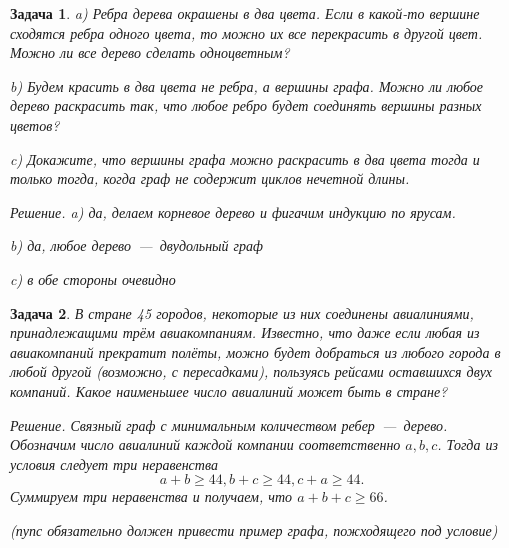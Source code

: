\documentclass[12pt,a4paper,fleqn]{article}
\newtheorem{exersize}{Задача}
\begin{document}
\begin{exersize}
	a) Ребра дерева окрашены в два цвета. Если в какой-то вершине сходятся ребра одного цвета, то можно их все перекрасить в другой цвет. Можно ли все дерево сделать одноцветным?
	
	b) Будем красить в два цвета не ребра, а вершины графа. Можно ли любое дерево раскрасить так, что любое ребро будет соединять вершины разных цветов?
	
	c) Докажите, что вершины графа можно раскрасить в два цвета тогда и только тогда, когда граф не содержит циклов нечетной длины.
	
	\emph{Решение.} a) да, делаем корневое дерево и фигачим индукцию по ярусам.
	
	b) да, любое дерево~---~двудольный граф
	
	c) в обе стороны очевидно
\end{exersize}	

\begin{exersize}
	В стране 45 городов, некоторые из них соединены авиалиниями, принадлежащими трём авиакомпаниям. Известно, что даже если любая из авиакомпаний прекратит полёты, можно будет добраться из любого города в любой другой (возможно, с пересадками), пользуясь рейсами оставшихся двух компаний. Какое наименьшее число авиалиний может быть в стране?
	
	\emph{Решение.} Связный граф с минимальным количеством ребер~---~дерево. Обозначим число авиалиний каждой компании соответственно $a, b, c$. Тогда из условия следует три неравенства $$a + b \geqslant 44, b + c \geqslant 44, c + a \geqslant 44.$$
	Суммируем три неравенства и получаем, что $a + b + c \geqslant 66$.
	
	(пупс обязательно должен привести пример графа, пожходящего под условие)
\end{exersize}	
\end{document}
